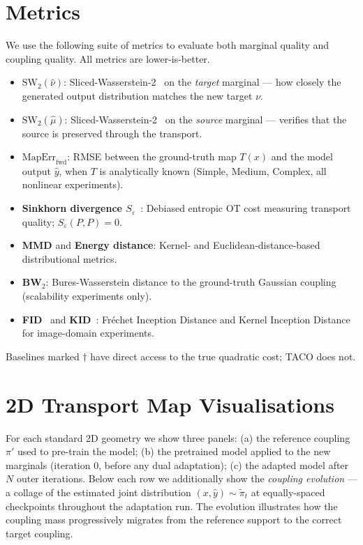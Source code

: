 \documentclass[11pt]{article}
\theoremstyle{definition}
\numberwithin{equation}{section}%
\begin{document}
% 
\section{Metrics}
\label{app:metrics}
% 

We use the following suite of metrics to evaluate both marginal quality and
coupling quality. All metrics are lower-is-better.

\begin{itemize}[noitemsep,topsep=2pt]
\item \textbf{$\mathrm{SW}_2(\hat\nu)$}: Sliced-Wasserstein-2~\citep{bonneel2015sliced} on the
  \emph{target} marginal — how closely the generated output distribution
  matches the new target $\nu$.
\item \textbf{$\mathrm{SW}_2(\hat\mu)$}: Sliced-Wasserstein-2~\citep{bonneel2015sliced} on the
  \emph{source} marginal — verifies that the source is preserved through
  the transport.
\item \textbf{$\mathrm{MapErr}_\mathrm{fwd}$}: RMSE between the
  ground-truth map $T(x)$ and the model output $\hat{y}$, when $T$ is
  analytically known (Simple, Medium, Complex, all nonlinear experiments).
\item \textbf{Sinkhorn divergence $S_\varepsilon$}~\citep{feydy2019interpolating}: Debiased entropic OT
  cost measuring transport quality; $S_\varepsilon(P,P)=0$.
\item \textbf{MMD} and \textbf{Energy distance}: Kernel- and
  Euclidean-distance-based distributional metrics.
\item \textbf{BW$_2$}: Bures-Wasserstein distance to the ground-truth
  Gaussian coupling (scalability experiments only).
\item \textbf{FID}~\citep{heusel2017gans} and \textbf{KID}~\citep{binkowski2018demystifying}: Fréchet Inception Distance and
  Kernel Inception Distance for image-domain experiments.
\end{itemize}

Baselines marked $\dagger$ have direct access to the true quadratic cost;
TACO does not.

% 
\section{2D Transport Map Visualisations}
\label{app:2d_transport}
% 

For each standard 2D geometry we show three panels:
(a) the reference coupling $\pi'$ used to pre-train the model;
(b) the pretrained model applied to the new marginals (iteration 0,
    before any dual adaptation);
(c) the adapted model after $N$ outer iterations.
Below each row we additionally show the \emph{coupling evolution} — a
collage of the estimated joint distribution $(x, \hat{y}) \sim \tilde\pi_t$
at equally-spaced checkpoints throughout the adaptation run.
The evolution illustrates how the coupling mass progressively migrates from
the reference support to the correct target coupling.
\end{document}
